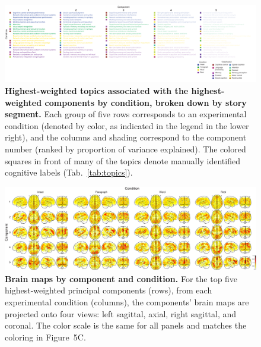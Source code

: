 \documentclass[english]{article}
\newcommand{\neurosynth}{5}
\begin{document}
\begin{figure}[t]
  \centering
  \includegraphics[width=\textwidth]{figs/top_terms_by_component}

\caption{\textbf{Highest-weighted topics associated with the highest-weighted
components by condition, broken down by story segment.} Each group of five rows
corresponds to an experimental condition (denoted by color, as indicated in the
legend in the lower right), and the columns and shading correspond to the
component number (ranked by proportion of variance explained). The colored
squares in front of many of the topics denote manually identified cognitive
labels (Tab.~\ref{tab:topics}).}

\label{fig:top-terms}
\end{figure}

\begin{figure}[t]
  \centering
  \includegraphics[width=\textwidth]{figs/component_brain_maps}

\caption{\textbf{Brain maps by component and condition.} For the top five
highest-weighted principal components (rows), from each experimental condition
(columns), the components' brain maps are projected onto four views: left
sagittal, axial, right sagittal, and coronal. The color scale is the same for
all panels and matches the coloring in Figure~\neurosynth C.}

\label{fig:components}
\end{figure}
\end{document}
